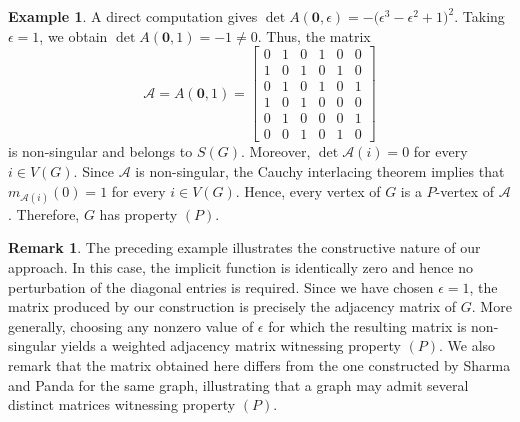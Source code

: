 \documentclass[12pt,reqno]{amsart}
\theoremstyle{plain}
\theoremstyle{definition}
\newtheorem{example}{Example}
\newtheorem{rem}{Remark}
\theoremstyle{block}
\theoremstyle{remark}
\numberwithin{equation}{section}
\begin{document}
\begin{example}
A direct computation gives
\(
\det A(\mathbf 0,\epsilon)
=
-\bigl(\epsilon^3-\epsilon^2+1\bigr)^2.
\)
Taking \(\epsilon=1\), we obtain
\(
\det A(\mathbf 0,1)=-1\neq0.
\)
Thus, the matrix
\[
\mathcal A=A(\mathbf 0,1)
=
\begin{bmatrix}
0&1&0&1&0&0\\
1&0&1&0&1&0\\
0&1&0&1&0&1\\
1&0&1&0&0&0\\
0&1&0&0&0&1\\
0&0&1&0&1&0
\end{bmatrix}
\]
is non-singular and belongs to \(S(G)\). Moreover,
\(
\det\mathcal A(i)=0
\)
for every \(i\in V(G)\). Since \(\mathcal A\) is non-singular, the
Cauchy interlacing theorem implies that
\(
m_{\mathcal A(i)}(0)=1
\)
for every \(i\in V(G)\). Hence, every vertex of \(G\) is a
\(P\)-vertex of \(\mathcal A\).
Therefore, \(G\) has property \((P)\). %
\end{example}
\begin{rem}
   The preceding example illustrates the constructive nature of our approach. In this case, the implicit function is identically zero and hence no perturbation of the diagonal entries is required. Since we have chosen \(\epsilon=1\), the matrix produced by our construction is precisely the adjacency matrix of \(G\). More generally, choosing any nonzero value of \(\epsilon\) for which the resulting matrix is non-singular yields a weighted adjacency matrix witnessing property \((P)\). We also remark that the matrix obtained here differs from the one constructed by Sharma and Panda for the same graph, illustrating that a graph may admit several distinct matrices witnessing property \((P)\). 
\end{rem}
\end{document}
